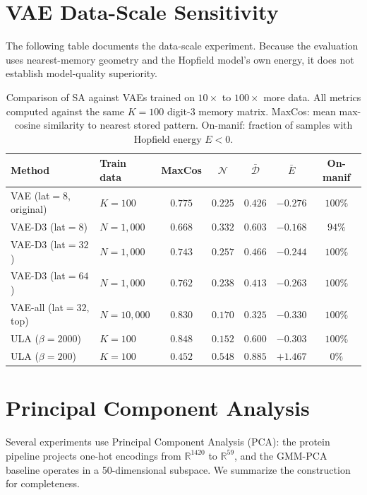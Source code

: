 \section{VAE Data-Scale Sensitivity}
The following table documents the data-scale experiment. Because
the evaluation uses nearest-memory geometry and the Hopfield model's own energy,
it does not establish model-quality superiority.
\begin{table}[ht]
\centering
\caption{Comparison of SA against VAEs trained on $10{\times}$ to $100{\times}$ more data. All metrics computed against the same $K{=}100$ digit-3 memory matrix. MaxCos: mean max-cosine similarity to nearest stored pattern. On-manif: fraction of samples with Hopfield energy $E<0$.}
\label{tab:full-vae}
\small
\begin{tabular}{@{}llccccc@{}}
\toprule
Method & Train data & MaxCos & $\mathcal{N}$ & $\bar{\mathcal{D}}$ & $\bar{E}$ & On-manif \\
\midrule
VAE (lat${=}8$, original)  & $K{=}100$ & $0.775$ & $0.225$ & $0.426$ & $-0.276$ & $100\%$ \\
VAE-D3 (lat${=}8$)         & $N{=}1{,}000$ & $0.668$ & $0.332$ & $0.603$ & $-0.168$ & $94\%$ \\
VAE-D3 (lat${=}32$)        & $N{=}1{,}000$ & $0.743$ & $0.257$ & $0.466$ & $-0.244$ & $100\%$ \\
VAE-D3 (lat${=}64$)        & $N{=}1{,}000$ & $0.762$ & $0.238$ & $0.413$ & $-0.263$ & $100\%$ \\
VAE-all (lat${=}32$, top)  & $N{=}10{,}000$ & $0.830$ & $0.170$ & $0.325$ & $-0.330$ & $100\%$ \\
\midrule
ULA ($\beta{=}2000$) & $K{=}100$ & $0.848$ & $0.152$ & $0.600$ & $-0.303$ & $100\%$ \\
ULA ($\beta{=}200$)          & $K{=}100$ & $0.452$ & $0.548$ & $0.885$ & $+1.467$ & $0\%$ \\
\bottomrule
\end{tabular}
\end{table}

\section{Principal Component Analysis}\label{app:pca}

Several experiments use Principal Component Analysis (PCA): the protein
pipeline projects one-hot encodings from $\mathbb{R}^{1420}$ to
$\mathbb{R}^{59}$, and the GMM-PCA baseline operates in a 50-dimensional
subspace. We summarize the construction for completeness.

